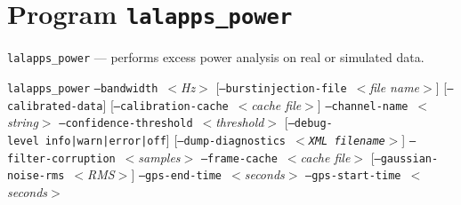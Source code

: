 \documentclass{article}
\newcommand{\prog}[1]{\texttt{#1}}
\newcommand{\option}[1]{\texttt{#1}}
\newcommand{\parm}[1]{$<$\textit{#1}$>$}
\newenvironment{entry}%
  {\begin{list}{}{\renewcommand{\makelabel}[1]%
    {\parbox[b]{\labelwidth}{\makebox[0pt][l]{\textbf{##1}}\\}}%
    \setlength{\labelwidth}{1em}%
    \setlength{\labelsep}{1em}%
    \setlength{\leftmargin}{2em}%
    \setlength{\topsep}{\medskipamount}%
    \setlength{\itemsep}{\medskipamount}%
    \setlength{\parsep}{\medskipamount}%
    \setlength{\listparindent}{0pt}}}
  {\end{list}}
\begin{document}
\section{Program \prog{lalapps\_power}}


\begin{entry}

\item[Name]
\prog{lalapps\_power} --- performs excess power analysis on real or
simulated data.

\item[Synopsis]
\prog{lalapps\_power} \newline \hspace*{0.5in}
\option{--bandwidth}~\parm{Hz} \newline \hspace*{0.5in}
[\option{--burstinjection-file}~\parm{file name}] \newline \hspace*{0.5in}
[\option{--calibrated-data}] \newline \hspace*{0.5in}
[\option{--calibration-cache}~\parm{cache file}] \newline \hspace*{0.5in}
\option{--channel-name}~\parm{string} \newline \hspace*{0.5in}
\option{--confidence-threshold}~\parm{threshold} \newline \hspace*{0.5in}
[\option{--debug-level}~\option{info|warn|error|off}] \newline \hspace*{0.5in}
[\option{--dump-diagnostics~\parm{XML filename}}] \newline \hspace*{0.5in}
\option{--filter-corruption}~\parm{samples} \newline \hspace*{0.5in}
\option{--frame-cache}~\parm{cache file} \newline \hspace*{0.5in}
[\option{--gaussian-noise-rms}~\parm{RMS}] \newline \hspace*{0.5in}
\option{--gps-end-time}~\parm{seconds} \newline \hspace*{0.5in}
\option{--gps-start-time}~\parm{seconds} \newline \hspace*{0.5in}

\end{entry}
\end{document}
